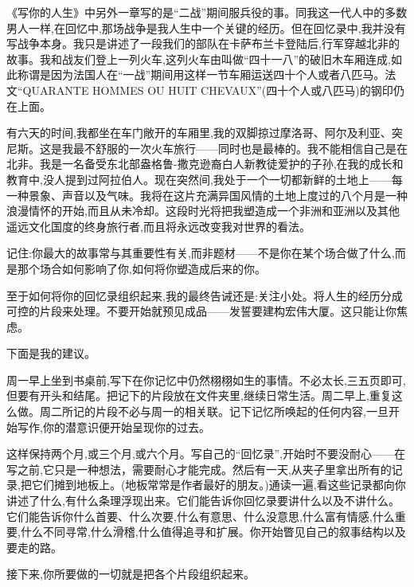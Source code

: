 《写你的人生》中另外一章写的是“二战”期间服兵役的事。同我这一代人中的多数男人一样,在回忆中,那场战争是我人生中一个关键的经历。但在回忆录中,我并没有写战争本身。我只是讲述了一段我们的部队在卡萨布兰卡登陆后,行军穿越北非的故事。我和战友们登上一列火车,这列火车由叫做“四十一八”的破旧木车厢连成,如此称谓是因为法国人在“一战”期间用这样一节车厢运送四十个人或者八匹马。法文“QUARANTE HOMMES OU HUIT CHEVAUX”(四十个人或八匹马)的钢印仍在上面。

有六天的时间,我都坐在车门敞开的车厢里,我的双脚掠过摩洛哥、阿尔及利亚、突尼斯。这是我最不舒服的一次火车旅行——同时也是最棒的。我不能相信自己是在北非。我是一名备受东北部盎格鲁-撒克逊裔白人新教徒爱护的子孙,在我的成长和教育中,没人提到过阿拉伯人。现在突然间,我处于一个一切都新鲜的土地上——每一种景象、声音以及气味。我将在这片充满异国风情的土地上度过的八个月是一种浪漫情怀的开始,而且从未冷却。这段时光将把我塑造成一个非洲和亚洲以及其他遥远文化国度的终身旅行者,而且将永远改变我对世界的看法。

记住:你最大的故事常与其重要性有关,而非题材——不是你在某个场合做了什么,而是那个场合如何影响了你,如何将你塑造成后来的你。

至于如何将你的回忆录组织起来,我的最终告诫还是:关注小处。将人生的经历分成可控的片段来处理。不要开始就预见成品——发誓要建构宏伟大厦。这只能让你焦虑。

下面是我的建议。

周一早上坐到书桌前,写下在你记忆中仍然栩栩如生的事情。不必太长,三五页即可,但要有开头和结尾。把记下的片段放在文件夹里,继续日常生活。周二早上,重复这么做。周二所记的片段不必与周一的相关联。记下记忆所唤起的任何内容,一旦开始写作,你的潜意识便开始呈现你的过去。

这样保持两个月,或三个月,或六个月。写自己的“回忆录”,开始时不要没耐心——在写之前,它只是一种想法，需要耐心才能完成。然后有一天,从夹子里拿出所有的记录,把它们摊到地板上。(地板常常是作者最好的朋友。)通读一遍,看这些记录都向你讲述了什么,有什么条理浮现出来。它们能告诉你回忆录要讲什么以及不讲什么。它们能告诉你什么首要、什么次要,什么有意思、什么没意思,什么富有情感,什么重要,什么不同寻常,什么滑稽,什么值得追寻和扩展。你开始瞥见自己的叙事结构以及要走的路。

接下来,你所要做的一切就是把各个片段组织起来。
